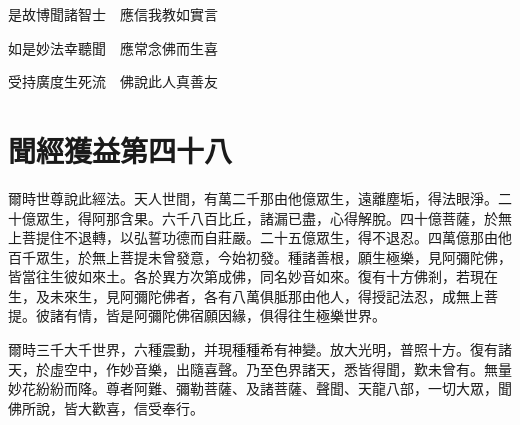 \documentclass{zhvt-classic}
\begin{document}
是故博聞諸智士　應信我教如實言

如是妙法幸聽聞　應常念佛而生喜

受持廣度生死流　佛說此人真善友

\chapter*{聞經獲益第四十八}

爾時世尊說此經法。天人世間，有萬二千那由他億眾生，遠離塵垢，得法眼淨。二十億眾生，得阿那含果。六千八百比丘，諸漏已盡，心得解脫。四十億菩薩，於無上菩提住不退轉，以弘誓功德而自莊嚴。二十五億眾生，得不退忍。四萬億那由他百千眾生，於無上菩提未曾發意，今始初發。種諸善根，願生極樂，見阿彌陀佛，皆當往生彼如來土。各於異方次第成佛，同名妙音如來。復有十方佛剎，若現在生，及未來生，見阿彌陀佛者，各有八萬俱胝那由他人，得授記法忍，成無上菩提。彼諸有情，皆是阿彌陀佛宿願因緣，俱得往生極樂世界。

爾時三千大千世界，六種震動，并現種種希有神變。放大光明，普照十方。復有諸天，於虛空中，作妙音樂，出隨喜聲。乃至色界諸天，悉皆得聞，歎未曾有。無量妙花紛紛而降。尊者阿難、彌勒菩薩、及諸菩薩、聲聞、天龍八部，一切大眾，聞佛所說，皆大歡喜，信受奉行。
\end{document}
